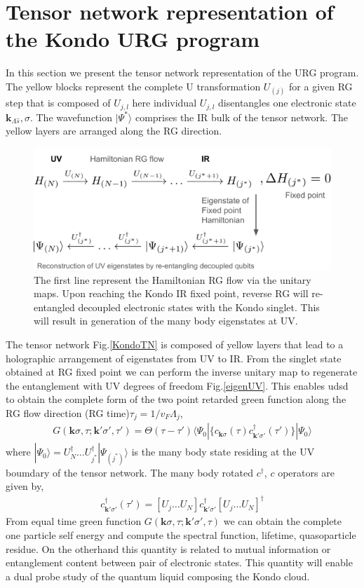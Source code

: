 \documentclass[aps,prx,preprint,groupedaddress]{revtex4-2}
\begin{document}
\section{Tensor network representation of the Kondo URG program}
In this section we present the tensor network representation of the URG program\cite{anirbanurg1,mukherjee2020}. The yellow blocks represent the complete U transformation $U_{(j)}$ for a given RG step that is composed of $U_{j,l}$ here individual $U_{j,l}$ disentangles one electronic state $\mathbf{k}_{\Lambda\hat{s}},\sigma$. The wavefunction $|\Psi^{*}\rangle$ comprises the IR bulk of the tensor network. The yellow layers are arranged along the RG direction. 
\begin{figure}
\includegraphics[width=\textwidth]{flowChart.png}
\caption{The first line represent the Hamiltonian RG flow via the unitary maps. Upon reaching the Kondo IR fixed point, reverse RG will re-entangled decoupled electronic states with the Kondo singlet. This will result in generation of the many body eigenstates at UV.}  \label{eigenUV}
\end{figure}
The tensor network Fig.\ref{KondoTN} is composed of yellow layers that lead to a holographic arrangement of eigenstates from UV to IR. From the singlet state obtained at RG fixed point we can perform the inverse unitary map to regenerate the entanglement with UV degrees of freedom Fig.\eqref{eigenUV}. This enables udsd to obtain the complete form of the two point retarded green function along the RG flow direction (RG time)$\tau_{j}=1/v_{F}\Lambda_{j}$,
\begin{eqnarray}
G(\mathbf{k}\sigma,\tau;\mathbf{k}'\sigma',\tau')=\Theta(\tau-\tau')\langle\Psi_{0}|\lbrace c_{\mathbf{k}\sigma}(\tau)c^{\dagger}_{\mathbf{k}'\sigma'}(\tau')\rbrace|\Psi_{0}\rangle
\end{eqnarray} 
where $|\Psi_{0}\rangle= U^{\dagger}_{N}\ldots U^{\dagger}_{j^{*}}|\Psi_{(j^{*})}\rangle$ is the many body state residing at the UV boumdary of the tensor network. The many body rotated $c^{\dagger}$, $c$ operators are given by,
\begin{eqnarray}
c^{\dagger}_{\mathbf{k}'\sigma'}(\tau')=[U_{j}\ldots U_{N}]c^{\dagger}_{\mathbf{k}'\sigma'}[U_{j}\ldots U_{N}]^{\dagger}
\end{eqnarray}
From equal time green function $G(\mathbf{k}\sigma,\tau;\mathbf{k}'\sigma',\tau)$ we can obtain the complete one particle self energy and compute the spectral function, lifetime, quasoparticle residue. On the otherhand this quantity is related to mutual information or entanglement content between pair of electronic states. This quantity will enable a dual probe study of the quantum liquid composing the Kondo cloud.
\appendix
\end{document}
